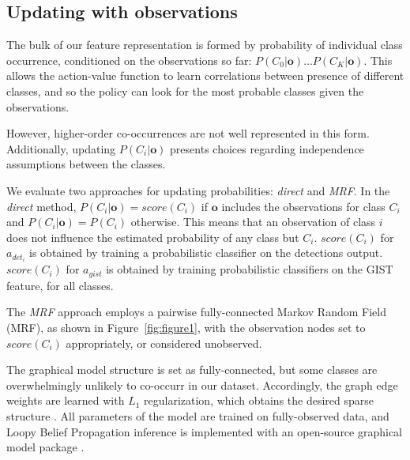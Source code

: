 \subsection{Updating with observations} \label{sec:updating}

The bulk of our feature representation is formed by probability of individual class occurrence, conditioned on the observations so far: $P(C_0|\mathbf{o}) \ldots P(C_K|\mathbf{o})$.
This allows the action-value function to learn correlations between presence of different classes, and so the policy can look for the most probable classes given the observations.

However, higher-order co-occurrences are not well represented in this form.
Additionally, updating $P(C_i|\mathbf{o})$ presents choices regarding independence assumptions between the classes.

We evaluate two approaches for updating probabilities: \emph{direct} and \emph{MRF}.
In the \emph{direct} method, $P(C_i|\mathbf{o}) = score(C_i)$ if $\mathbf{o}$ includes the observations for class $C_i$ and $P(C_i|\mathbf{o}) = P(C_i)$ otherwise.
This means that an observation of class $i$ does not influence the estimated probability of any class but $C_i$.
$score(C_i)$ for $a_{{det}_i}$ is obtained by training a probabilistic classifier on the detections output.
$score(C_i)$ for $a_{gist}$ is obtained by training probabilistic classifiers on the GIST feature, for all classes.

The \emph{MRF} approach employs a pairwise fully-connected Markov Random Field (MRF), as shown in Figure~\ref{fig:figure1}, with the observation nodes set to $score(C_i)$ appropriately, or considered unobserved.

The graphical model structure is set as fully-connected, but some classes are overwhelmingly unlikely to co-occurr in our dataset.
Accordingly, the graph edge weights are learned with $L_1$ regularization, which obtains the desired sparse structure \cite{Lee2006}.
All parameters of the model are trained on fully-observed data, and Loopy Belief Propagation inference is implemented with an open-source graphical model package \cite{Jaimovich2010}.

